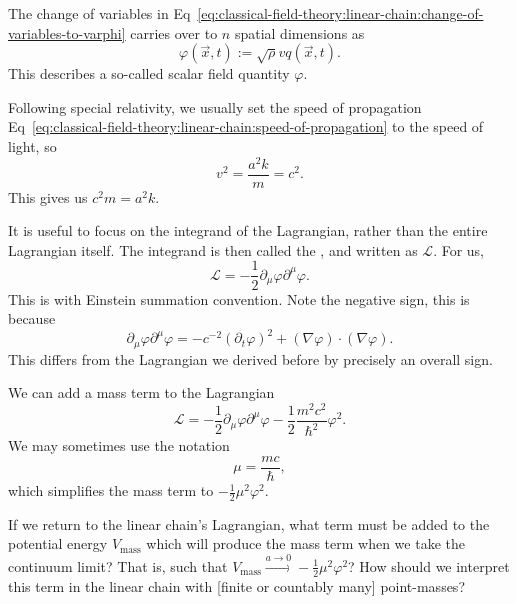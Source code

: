 The change of variables in
Eq~\eqref{eq:classical-field-theory:linear-chain:change-of-variables-to-varphi}
carries over to $n$ spatial dimensions as
\begin{equation}
\varphi(\vec{x},t) := \sqrt{\rho}vq(\vec{x},t).
\end{equation}
This describes a so-called scalar field quantity $\varphi$.

Following special relativity, we usually set the speed of propagation Eq~\eqref{eq:classical-field-theory:linear-chain:speed-of-propagation}
to the speed of light, so
\begin{equation}
v^{2} = \frac{a^{2}k}{m} = c^{2}.
\end{equation}
This gives us $c^{2}m=a^{2}k$.

It is useful to focus on the integrand of the Lagrangian, rather than
the entire Lagrangian itself. The integrand is then called the
, and written as $\mathcal{L}$. For us,
\begin{equation}
\mathcal{L} = -\frac{1}{2}\partial_{\mu}\varphi\partial^{\mu}\varphi.
\end{equation}
This is with Einstein summation convention. Note the negative sign, this
is because
\begin{equation}
\partial_{\mu}\varphi\partial^{\mu}\varphi = -c^{-2}(\partial_{t}\varphi)^{2}
+(\nabla\varphi)\cdot(\nabla\varphi).
\end{equation}
This differs from the Lagrangian we derived before by precisely an
overall sign.

We can add a mass term to the Lagrangian
\begin{equation}
\mathcal{L}=-\frac{1}{2}\partial_{\mu}\varphi\partial^{\mu}\varphi-\frac{1}{2}\frac{m^{2}c^{2}}{\hbar^{2}}\varphi^{2}.
\end{equation}
We may sometimes use the notation
\begin{equation}
\mu = \frac{mc}{\hbar},
\end{equation}
which simplifies the mass term to $-\frac{1}{2}\mu^{2}\varphi^{2}$.

\begin{exercise}
If we return to the linear chain's Lagrangian, what term must be added
to the potential energy $V_{\text{mass}}$ which will produce the mass term when
we take the continuum limit? That is, such that $V_{\text{mass}}\xrightarrow{a\to0}-\frac{1}{2}\mu^{2}\varphi^{2}$? How should we interpret this term
in the linear chain with [finite or countably many] point-masses?
\end{exercise}

